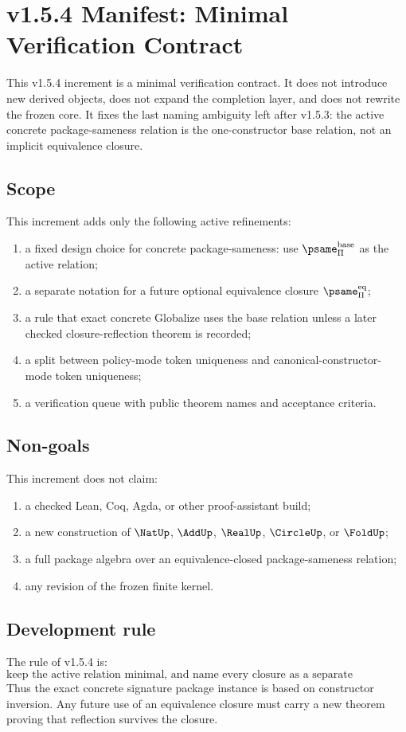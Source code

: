 
\chapter{v1.5.4 Manifest: Minimal Verification Contract}
\label{ch:v154-manifest}

This v1.5.4 increment is a minimal verification contract. It does not introduce new derived objects, does not expand the completion layer, and does not rewrite the frozen core. It fixes the last naming ambiguity left after v1.5.3: the active concrete package-sameness relation is the one-constructor base relation, not an implicit equivalence closure.

\section{Scope}
This increment adds only the following active refinements:
\begin{enumerate}
  \item a fixed design choice for concrete package-sameness: use \(\psame_{\Pi}^{\mathrm{base}}\) as the active relation;
  \item a separate notation for a future optional equivalence closure \(\psame_{\Pi}^{\mathrm{eq}}\);
  \item a rule that exact concrete Globalize uses the base relation unless a later checked closure-reflection theorem is recorded;
  \item a split between policy-mode token uniqueness and canonical-constructor-mode token uniqueness;
  \item a verification queue with public theorem names and acceptance criteria.
\end{enumerate}

\section{Non-goals}
This increment does not claim:
\begin{enumerate}
  \item a checked Lean, Coq, Agda, or other proof-assistant build;
  \item a new construction of \(\NatUp\), \(\AddUp\), \(\RealUp\), \(\CircleUp\), or \(\FoldUp\);
  \item a full package algebra over an equivalence-closed package-sameness relation;
  \item any revision of the frozen finite kernel.
\end{enumerate}

\section{Development rule}
The rule of v1.5.4 is:
\[
  \text{keep the active relation minimal, and name every closure as a separate obligation.}
\]
Thus the exact concrete signature package instance is based on constructor inversion. Any future use of an equivalence closure must carry a new theorem proving that reflection survives the closure.
